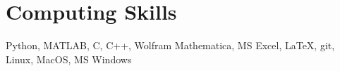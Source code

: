 \section{Computing Skills}

Python,
MATLAB,
C,
C++,
Wolfram Mathematica,
MS Excel,
\LaTeX,
git,
Linux,
MacOS,
MS Windows